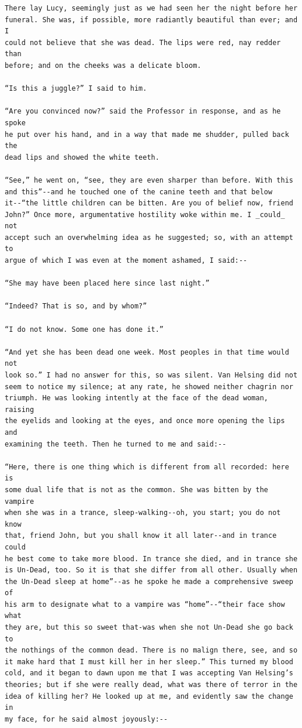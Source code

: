 \documentclass{article}
\begin{document}
\begin{verbatim}
There lay Lucy, seemingly just as we had seen her the night before her
funeral. She was, if possible, more radiantly beautiful than ever; and I
could not believe that she was dead. The lips were red, nay redder than
before; and on the cheeks was a delicate bloom.

“Is this a juggle?” I said to him.

“Are you convinced now?” said the Professor in response, and as he spoke
he put over his hand, and in a way that made me shudder, pulled back the
dead lips and showed the white teeth.

“See,” he went on, “see, they are even sharper than before. With this
and this”--and he touched one of the canine teeth and that below
it--“the little children can be bitten. Are you of belief now, friend
John?” Once more, argumentative hostility woke within me. I _could_ not
accept such an overwhelming idea as he suggested; so, with an attempt to
argue of which I was even at the moment ashamed, I said:--

“She may have been placed here since last night.”

“Indeed? That is so, and by whom?”

“I do not know. Some one has done it.”

“And yet she has been dead one week. Most peoples in that time would not
look so.” I had no answer for this, so was silent. Van Helsing did not
seem to notice my silence; at any rate, he showed neither chagrin nor
triumph. He was looking intently at the face of the dead woman, raising
the eyelids and looking at the eyes, and once more opening the lips and
examining the teeth. Then he turned to me and said:--

“Here, there is one thing which is different from all recorded: here is
some dual life that is not as the common. She was bitten by the vampire
when she was in a trance, sleep-walking--oh, you start; you do not know
that, friend John, but you shall know it all later--and in trance could
he best come to take more blood. In trance she died, and in trance she
is Un-Dead, too. So it is that she differ from all other. Usually when
the Un-Dead sleep at home”--as he spoke he made a comprehensive sweep of
his arm to designate what to a vampire was “home”--“their face show what
they are, but this so sweet that-was when she not Un-Dead she go back to
the nothings of the common dead. There is no malign there, see, and so
it make hard that I must kill her in her sleep.” This turned my blood
cold, and it began to dawn upon me that I was accepting Van Helsing’s
theories; but if she were really dead, what was there of terror in the
idea of killing her? He looked up at me, and evidently saw the change in
my face, for he said almost joyously:--


\end{verbatim}
\end{document}
